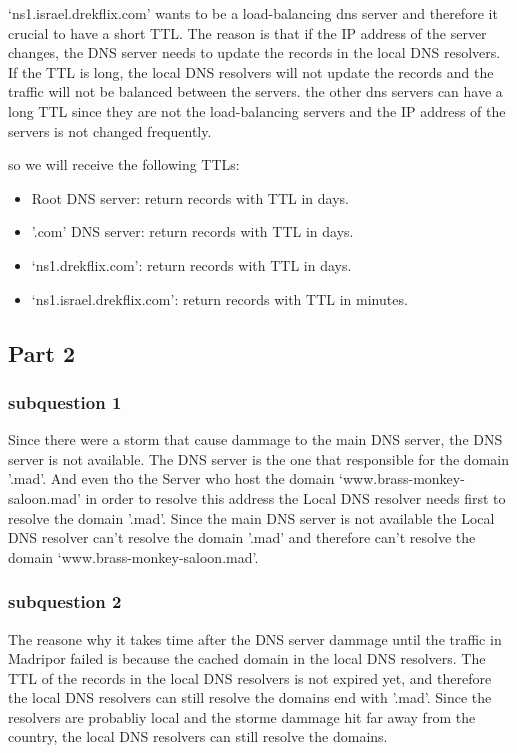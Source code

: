 \documentclass{article}
\begin{document}
`ns1.israel.drekflix.com' wants to be a load-balancing dns server and therefore it crucial to have a short TTL. The reason is that if the IP address of the server changes, the DNS server needs to update the records in the local DNS resolvers. If the TTL is long, the local DNS resolvers will not update the records and the traffic will not be balanced between the servers.
the other dns servers can have a long TTL since they are not the load-balancing servers and the IP address of the servers is not changed frequently.

so we will receive the following TTLs:
\begin{itemize}
    \item Root DNS server: return records with TTL in days.
    \item '.com' DNS server: return records with TTL in days.
    \item `ns1.drekflix.com': return records with TTL in days.
    \item `ns1.israel.drekflix.com': return records with TTL in minutes.
    \end{itemize}

\subsection{Part 2}


\subsubsection{subquestion 1}
Since there were a storm that cause dammage to the main DNS server, the DNS server is not available. The DNS server is the one that responsible for the domain '.mad'. And even tho the Server who host the domain `www.brass-monkey-saloon.mad' in order to resolve this address the Local DNS resolver needs first to resolve the domain '.mad'. Since the main DNS server is not available the Local DNS resolver can't resolve the domain '.mad' and therefore can't resolve the domain `www.brass-monkey-saloon.mad'. 
\subsubsection{subquestion 2}
The reasone why it takes time after the DNS server dammage until the traffic in Madripor failed is because the cached domain in the local DNS resolvers. The TTL of the records in the local DNS resolvers is not expired yet, and therefore the local DNS resolvers can still resolve the domains end with '.mad'. Since the resolvers are probabliy local and the storme dammage hit far away from the country, the local DNS resolvers can still resolve the domains. 
\end{document}
